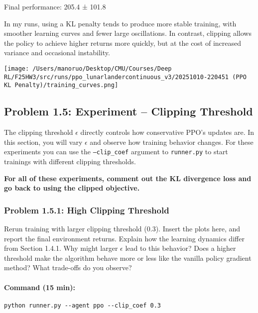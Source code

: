 \documentclass[12pt]{article}
\begin{document}
\begin{solution}[height=5cm]

Final performance: 205.4 ± 101.8

In my runs, using a KL penalty tends to produce more stable training, with smoother learning curves and fewer large oscillations. 
In contrast, clipping allows the policy to achieve higher returns more quickly, 
but at the cost of increased variance and occasional instability. 

    \centering
        \texttt{[image: /Users/manoruo/Desktop/CMU/Courses/Deep RL/F25HW3/src/runs/ppo\_lunarlandercontinuous\_v3/20251010-220451 (PPO KL Penalty)/training\_curves.png]}
        \label{fig:ppo_kl}

\end{solution}

\clearpage
\newpage

\subsection*{Problem 1.5: Experiment – Clipping Threshold}

The clipping threshold $\epsilon$ directly controls how conservative PPO’s updates are. In this section, you will vary $\epsilon$ and observe how training behavior changes. For these experiments you can use the \texttt{--clip\_coef} argument to \texttt{runner.py} to start trainings with different clipping thresholds.

\textbf{For all of these experiments, comment out the KL divergence loss and go back to using the clipped objective.}

\subsubsection*{Problem 1.5.1: High Clipping Threshold}
Rerun training with larger clipping threshold (0.3). Insert the plots here, and report the final environment returns.  Explain how the learning dynamics differ from Section 1.4.1. Why might larger $\epsilon$ lead to this behavior? Does a higher threshold make the algorithm behave more or less like the vanilla policy gradient method? What trade-offs do you observe?

\paragraph{Command (15 min):}
\begin{verbatim}
python runner.py --agent ppo --clip_coef 0.3
\end{verbatim}
\end{document}
